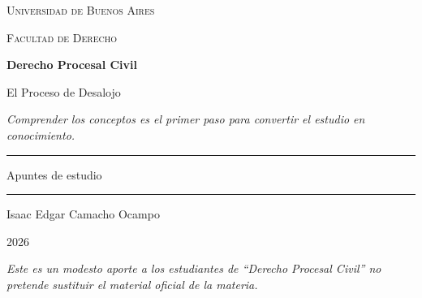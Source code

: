 \documentclass[12pt,oneside]{book}
\newcommand{\universidad}{Universidad de Buenos Aires}
\newcommand{\facultad}{Facultad de Derecho}
\newcommand{\materia}{Derecho Procesal Civil}
\newcommand{\titulo}{El Proceso de Desalojo}
\newcommand{\autor}{Isaac Edgar Camacho Ocampo}
\newcommand{\anio}{2026}
\begin{document}
\begin{titlepage}
\thispagestyle{empty}

\begin{center}

\vspace*{1cm}

{\large \textsc{\universidad}}

\vspace{0.2cm}

{\large \textsc{\facultad}}

\vspace{3cm}

{\Huge \textbf{\materia}}

\vspace{1cm}

{\LARGE \titulo}

\vspace{0.8cm}

\textit{Comprender los conceptos es el primer paso para convertir el estudio en conocimiento.}

\vspace{1.2cm}

\rule{0.70\textwidth}{0.5pt}

\vspace{0.5cm}

{\large Apuntes de estudio}

\vspace{0.5cm}

\rule{0.70\textwidth}{0.5pt}

\vfill

{\large \autor}

\vspace{0.3cm}

{\large \anio}

\end{center}

\vfill

\begin{flushleft}
\textit{Este es un modesto aporte a los estudiantes de ``Derecho Procesal Civil'' no pretende sustituir el material oficial de la materia.}
\end{flushleft}

\end{titlepage}

\tableofcontents
\clearpage
\end{document}
